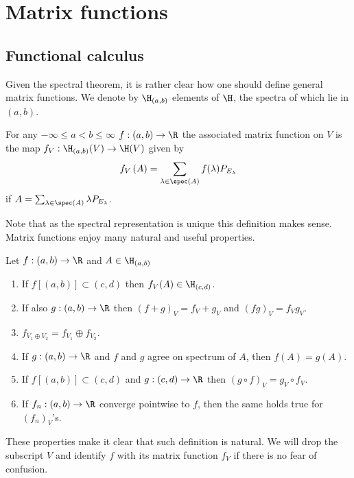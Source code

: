 \section{Matrix functions}

\subsection{Functional calculus}

Given the spectral theorem, it is rather clear how one should define general matrix functions. We denote by $\H_{(a, b)}$ elements of $\H$, the spectra of which lie in $(a, b)$.

\begin{maar}
	For any $-\infty \leq a < b \leq \infty$ $f : (a, b) \to \R$ the associated matrix function on $V$ is the map $f_{V} : \H_{(a, b)}(V) \to \H(V)$ given by
	\begin{align*}
		f_{V}\left(A\right) = \sum_{\lambda \in \spec(A)} f(\lambda) P_{E_{\lambda}}
	\end{align*}
	if $A = \sum_{\lambda \in \spec(A)} \lambda P_{E_{\lambda}}$.
\end{maar}
Note that as the spectral representation is unique this definition makes sense. Matrix functions enjoy many natural and useful properties.

\begin{prop}\label{basic_matrix}
	Let $f : (a,b) \to \R$ and $A \in \H_{(a, b)}$
	\begin{enumerate}
		\item If $f[(a, b)] \subset (c, d)$ then $f_{V}(A) \in \H_{(c, d)}$.
		\item If also $g : (a, b) \to \R$ then $(f + g)_{V} = f_{V} + g_{V}$ and $(fg)_{V} = f_{V}g_{V}$.
		\item $f_{V_{1} \oplus V_{2}} = f_{V_{1}} \oplus f_{V_{2}}$.
		\item If $g : (a, b) \to \R$ and $f$ and $g$ agree on spectrum of $A$, then $f(A) = g(A)$.
		\item If $f[(a, b)] \subset (c, d)$ and $g : (c, d) \to \R$ then $(g \circ f)_{V} = g_{V} \circ f_{V}$.
		\item If $f_{n} : (a, b) \to \R$ converge pointwise to $f$, then the same holds true for $(f_{n})_{V}$'s.
	\end{enumerate}
\end{prop}

These properties make it clear that such definition is natural. We will drop the subscript $V$ and identify $f$ with its matrix function $f_{V}$ if there is no fear of confusion.

